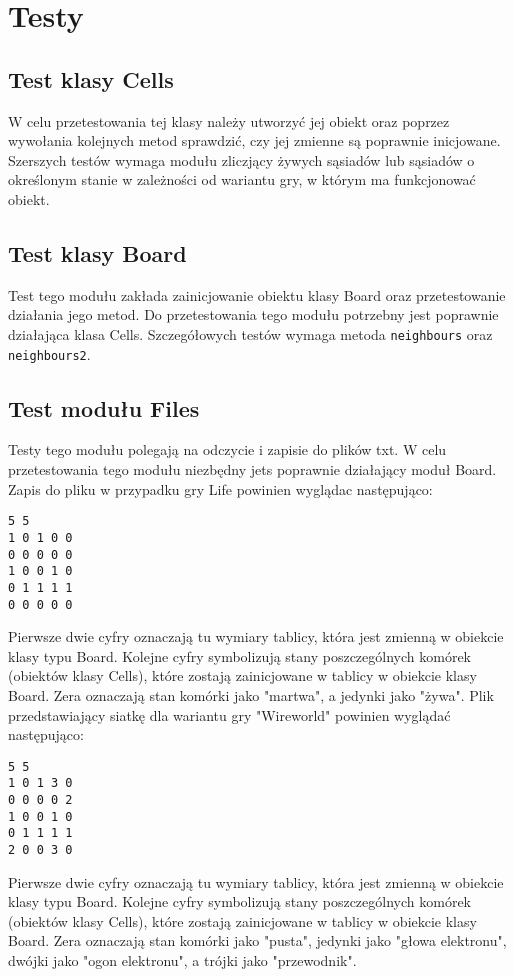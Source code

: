 \documentclass[10pt, oneside]{article}
\begin{document}
\section {Testy}
\subsection {Test klasy Cells}
W celu przetestowania tej klasy należy utworzyć jej obiekt oraz poprzez wywołania kolejnych metod sprawdzić, czy jej zmienne są poprawnie inicjowane. Szerszych testów wymaga modułu zliczjący żywych sąsiadów lub sąsiadów o określonym stanie w zależności od wariantu gry, w którym ma funkcjonować obiekt.
\subsection{Test klasy Board}
Test tego modułu zakłada zainicjowanie obiektu klasy Board oraz przetestowanie działania jego metod. Do przetestowania tego modułu potrzebny jest poprawnie działająca klasa Cells. Szczegółowych testów wymaga metoda \texttt{neighbours} oraz \texttt{neighbours2}.
\subsection {Test modułu Files}
Testy tego modułu polegają na odczycie i zapisie do plików txt. W celu przetestowania tego modułu niezbędny jets poprawnie działający moduł Board. Zapis do pliku w przypadku gry Life powinien wyglądac następująco:
\begin {verbatim}
5 5 
1 0 1 0 0
0 0 0 0 0
1 0 0 1 0
0 1 1 1 1
0 0 0 0 0 
\end{verbatim}
Pierwsze dwie cyfry oznaczają tu wymiary tablicy, która jest zmienną w obiekcie klasy typu Board. Kolejne cyfry symbolizują stany poszczególnych komórek (obiektów klasy Cells), które zostają zainicjowane w tablicy w obiekcie klasy Board. Zera oznaczają stan komórki jako "martwa", a jedynki jako "żywa".
Plik przedstawiający siatkę dla wariantu gry "Wireworld" powinien wyglądać następująco:
\begin {verbatim}
5 5 
1 0 1 3 0
0 0 0 0 2
1 0 0 1 0
0 1 1 1 1
2 0 0 3 0 
\end{verbatim}
Pierwsze dwie cyfry oznaczają tu wymiary tablicy, która jest zmienną w obiekcie klasy typu Board. Kolejne cyfry symbolizują stany poszczególnych komórek (obiektów klasy Cells), które zostają zainicjowane w tablicy w obiekcie klasy Board. Zera oznaczają stan komórki jako "pusta",  jedynki jako "głowa elektronu", dwójki jako "ogon elektronu", a trójki jako "przewodnik".
\end{document}
